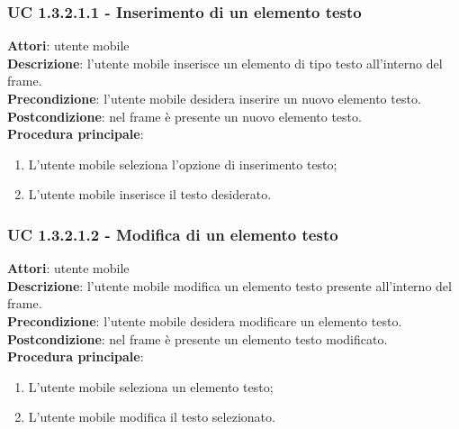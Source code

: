 \subsubsection{UC 1.3.2.1.1 - Inserimento di un elemento testo}{
	\label{uc1.3.2.1.1}
	\textbf{Attori}: utente mobile \\
	\textbf{Descrizione}: l'utente mobile inserisce un elemento di tipo testo all'interno del frame. \\
	\textbf{Precondizione}: l'utente mobile desidera inserire un nuovo elemento testo.	\\
	\textbf{Postcondizione}: nel frame è presente un nuovo elemento testo.	\\
	\textbf{Procedura principale}:
	\begin{enumerate}
		\item L'utente mobile seleziona l'opzione di inserimento testo;
		\item L'utente mobile inserisce il testo desiderato.
	\end{enumerate}
	}
\subsubsection{UC 1.3.2.1.2 - Modifica di un elemento testo}{
	\label{uc1.3.2.1.2}
	\textbf{Attori}: utente mobile \\
	\textbf{Descrizione}: l'utente mobile modifica un elemento testo presente all'interno del frame. \\
	\textbf{Precondizione}: l'utente mobile desidera modificare un elemento testo.	\\
	\textbf{Postcondizione}: nel frame è presente un elemento testo modificato.	\\
	\textbf{Procedura principale}:
	\begin{enumerate}
		\item L'utente mobile seleziona un elemento testo;
		\item L'utente mobile modifica il testo selezionato.
	\end{enumerate}
	}	
